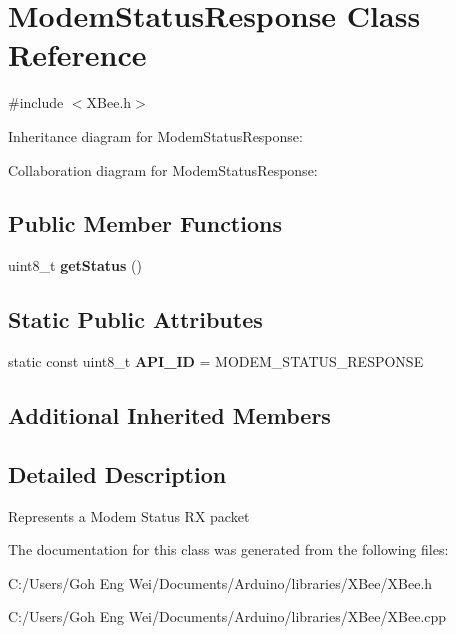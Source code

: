 \hypertarget{class_modem_status_response}{}\section{Modem\+Status\+Response Class Reference}
\label{class_modem_status_response}


{\ttfamily \#include $<$X\+Bee.\+h$>$}



Inheritance diagram for Modem\+Status\+Response\+:


Collaboration diagram for Modem\+Status\+Response\+:
\subsection*{Public Member Functions}
\begin{DoxyCompactItemize}
\item 
\hypertarget{class_modem_status_response_a901244d6313391f60eec7764b10de3aa}{}\label{class_modem_status_response_a901244d6313391f60eec7764b10de3aa} 
uint8\+\_\+t {\bfseries get\+Status} ()
\end{DoxyCompactItemize}
\subsection*{Static Public Attributes}
\begin{DoxyCompactItemize}
\item 
\hypertarget{class_modem_status_response_ae3de385d0a44915b1bd41b4ab13a0066}{}\label{class_modem_status_response_ae3de385d0a44915b1bd41b4ab13a0066} 
static const uint8\+\_\+t {\bfseries A\+P\+I\+\_\+\+ID} = M\+O\+D\+E\+M\+\_\+\+S\+T\+A\+T\+U\+S\+\_\+\+R\+E\+S\+P\+O\+N\+SE
\end{DoxyCompactItemize}
\subsection*{Additional Inherited Members}


\subsection{Detailed Description}
Represents a Modem Status RX packet 

The documentation for this class was generated from the following files\+:\begin{DoxyCompactItemize}
\item 
C\+:/\+Users/\+Goh Eng Wei/\+Documents/\+Arduino/libraries/\+X\+Bee/X\+Bee.\+h\item 
C\+:/\+Users/\+Goh Eng Wei/\+Documents/\+Arduino/libraries/\+X\+Bee/X\+Bee.\+cpp\end{DoxyCompactItemize}
